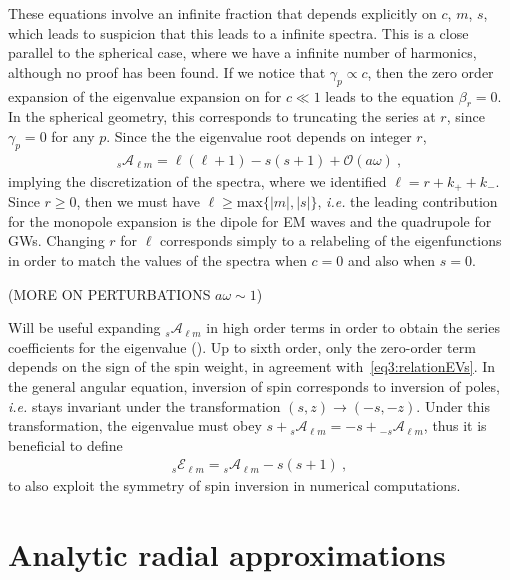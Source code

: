 These equations involve an infinite fraction that depends explicitly on $c$, $m$, $s$, which leads to suspicion that this leads to a infinite spectra.
This is a close parallel to the spherical case, where we have a infinite number of harmonics, although no proof has been found.
If we notice that $\gamma_p\propto c$, then the zero order expansion of the eigenvalue expansion on for $c\ll 1$ leads to the equation $\beta_r=0$.
In the spherical geometry, this corresponds to truncating the series at $r$, since $\gamma_p=0$ for any $p$. Since the the eigenvalue root depends on integer $r$, 
\begin{align}
    {}_{s}\mathscr{A}_{\ell m} = \ell(\ell+1) - s(s+1) + \mathscr{O}(a\omega)~,
    \label{eq3:evSWSH0th}
\end{align}
implying the discretization of the spectra, where we identified $\ell=r+k_{+}+k_{-}$. 
Since $r\ge 0$, then we must have $\ell\ge\mathrm{max}\{|m|,|s|\}$, \emph{i.e.} the leading contribution for the monopole expansion is the dipole for EM waves and the quadrupole for GWs.
Changing $r$ for $\ell$ corresponds simply to a relabeling of the eigenfunctions in order to match the values of the spectra when $c=0$ and also when $s=0$.

(MORE ON PERTURBATIONS $a\omega\sim 1$)

Will be useful expanding ${}_{s}\mathscr{A}_{\ell m}$ in high order terms in order to obtain the series coefficients for the eigenvalue ().
Up to sixth order, only the zero-order term depends on the sign of the spin weight, in agreement with~\eqref{eq3:relationEVs}.
In the general angular equation, inversion of spin corresponds to inversion of poles, \emph{i.e.} stays invariant under the transformation $(s,z)\to(-s,-z)$.
Under this transformation, the eigenvalue must obey $s+ {}_{s}\mathscr{A}_{\ell m} = -s + {}_{-s}\mathscr{A}_{\ell m}$, thus it is beneficial to define 
\begin{align}
    {}_{s}\mathscr{E}_{\ell m} = {}_{s}\mathscr{A}_{\ell m} - s(s+1) ~,
    \label{eq3:sElm}
\end{align}
to also exploit the symmetry of spin inversion in numerical computations.


\section{Analytic radial approximations}

